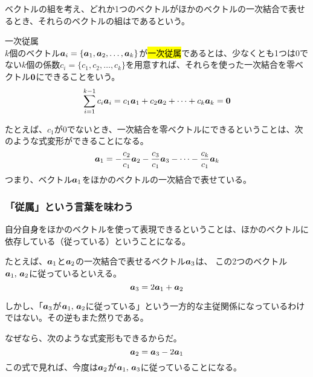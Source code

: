 \documentclass[../../imaging-math]{subfiles}
\begin{document}
ベクトルの組を考え、どれか1つのベクトルがほかのベクトルの一次結合で表せるとき、それらのベクトルの組はであるという。

\begin{definition}{一次従属}\quad\\
  $k$個のベクトル$\vb*{a}_i = \{ \vb*{a}_1, \vb*{a}_2, \ldots, \vb*{a}_k \}$が\hl{一次従属}であるとは、少なくとも1つは$0$でない$k$個の係数$c_i = \{c_1, c_2, \ldots, c_k\}$を用意すれば、それらを使った一次結合を零ベクトル$\vb{0}$にできることをいう。
  \large
  \begin{equation*}
    \sum_{i=1}^{k-1} c_i \vb*{a}_i = c_1 \vb*{a}_1 + c_2 \vb*{a}_2 + \cdots + c_k\vb*{a}_{k} = \vb{0}
  \end{equation*}
\end{definition}

たとえば、$c_1$が$0$でないとき、一次結合を零ベクトルにできるということは、次のような式変形ができることになる。
\begin{equation*}
  \vb*{a}_1 = -\frac{c_2}{c_1} \vb*{a}_2 - \frac{c_3}{c_1} \vb*{a}_3 - \cdots - \frac{c_k}{c_1} \vb*{a}_{k}
\end{equation*}
つまり、ベクトル$\vb*{a}_1$をほかのベクトルの一次結合で表せている。

\subsubsection{「従属」という言葉を味わう}

自分自身をほかのベクトルを使って表現できるということは、ほかのベクトルに依存している（従っている）ということになる。

\br

たとえば、$\vb*{a}_1$と$\vb*{a}_2$の一次結合で表せるベクトル$\vb*{a}_3$は、 この2つのベクトル$\vb*{a}_1 ,\, \vb*{a}_2$に従っているといえる。
\begin{equation*}
  \vb*{a}_3 = 2 \vb*{a}_1 + \vb*{a}_2
\end{equation*}

しかし、「$\vb*{a}_3$が$\vb*{a}_1 ,\, \vb*{a}_2$に従っている」という一方的な主従関係になっているわけではない。その逆もまた然りである。

なぜなら、次のような式変形もできるからだ。
\begin{equation*}
  \vb*{a}_2 = \vb*{a}_3 - 2 \vb*{a}_1
\end{equation*}
この式で見れば、今度は$\vb*{a}_2$が$\vb*{a}_1 ,\, \vb*{a}_3$に従っていることになる。

\br
\end{document}
